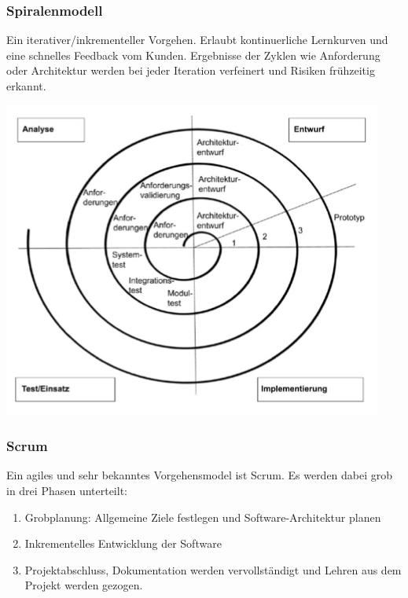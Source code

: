\subsubsection{Spiralenmodell}
Ein iterativer/inkrementeller Vorgehen. Erlaubt kontinuerliche Lernkurven und eine schnelles Feedback vom Kunden. Ergebnisse der Zyklen wie Anforderung oder Architektur werden bei jeder Iteration verfeinert und Risiken frühzeitig erkannt.
\begin{center}
	\includegraphics[width=0.6\columnwidth]{Images/spiralmodell}
\end{center}

\subsubsection{Scrum}
Ein agiles und sehr bekanntes Vorgehensmodel ist Scrum. Es werden dabei grob in drei Phasen unterteilt:
\begin{enumerate}[nosep]
	\item Grobplanung: Allgemeine Ziele festlegen und Software-Architektur planen
	\item Inkrementelles Entwicklung der Software
	\item Projektabschluss, Dokumentation werden vervollständigt und Lehren aus dem Projekt werden gezogen.
\end{enumerate}

